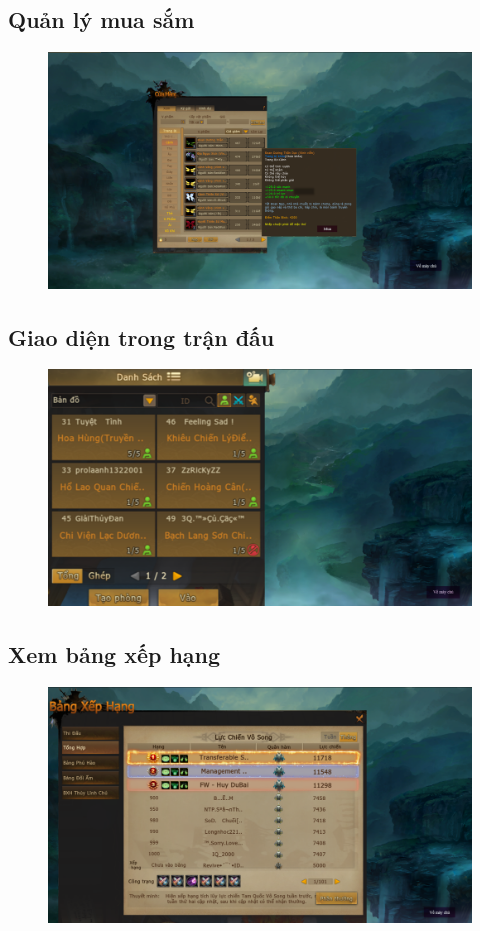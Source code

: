 \documentclass[3p]{elsarticle}
\begin{document}
\subsection{Quản lý mua sắm}
\begin{figure}[!htbp]
	\centering
	\includegraphics[scale=.3]{images/shop_management.pdf}
\end{figure}
\newpage
\subsection{Giao diện trong trận đấu}
\begin{figure}[!htbp]
	\centering
	\includegraphics[scale=.3]{images/play_game.pdf}
\end{figure}
\subsection{Xem bảng xếp hạng}
\begin{figure}[!htbp]
	\centering
	\includegraphics[scale=.3]{images/view_leaderboard.pdf}
\end{figure}
\end{document}
